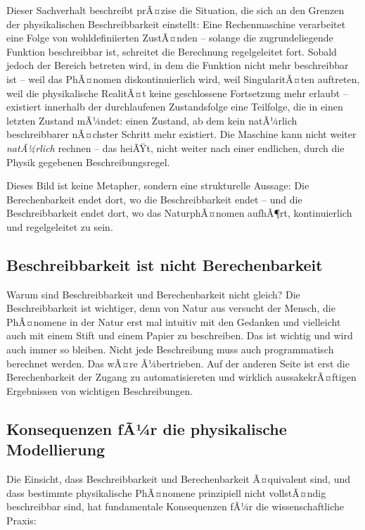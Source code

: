﻿\documentclass[12pt, a4paper]{article}
\begin{document}
	Dieser Sachverhalt beschreibt prÃ¤zise die Situation, die sich an den Grenzen der physikalischen Beschreibbarkeit einstellt: Eine Rechenmaschine verarbeitet eine Folge von wohldefiniierten ZustÃ¤nden -- solange die zugrundeliegende Funktion beschreibbar ist, schreitet die Berechnung regelgeleitet fort. Sobald jedoch der Bereich betreten wird, in dem die Funktion nicht mehr beschreibbar ist -- weil das PhÃ¤nomen diskontinuierlich wird, weil SingularitÃ¤ten auftreten, weil die physikalische RealitÃ¤t keine geschlossene Fortsetzung mehr erlaubt -- existiert innerhalb der durchlaufenen Zustandsfolge eine Teilfolge, die in einen letzten Zustand mÃ¼ndet: einen Zustand, ab dem kein natÃ¼rlich beschreibbarer nÃ¤chster Schritt mehr existiert. Die Maschine kann nicht weiter \textit{natÃ¼rlich} rechnen -- das heiÃŸt, nicht weiter nach einer endlichen, durch die Physik gegebenen Beschreibungsregel.

	Dieses Bild ist keine Metapher, sondern eine strukturelle Aussage: Die Berechenbarkeit endet dort, wo die Beschreibbarkeit endet -- und die Beschreibbarkeit endet dort, wo das NaturphÃ¤nomen aufhÃ¶rt, kontinuierlich und regelgeleitet zu sein.
	
	\subsection{Beschreibbarkeit ist nicht Berechenbarkeit}
	
	Warum sind Beschreibbarkeit und Berechenbarkeit nicht gleich? Die Beschreibbarkeit ist wichtiger, denn von Natur aus versucht der Mensch, die PhÃ¤nomene in der Natur erst mal intuitiv mit den Gedanken und vielleicht auch mit einem Stift und einem Papier zu beschreiben. Das ist wichtig und wird auch immer so bleiben. Nicht jede Beschreibung muss auch programmatisch berechnet werden. Das wÃ¤re Ã¼bertrieben. Auf der anderen Seite ist erst die Berechenbarkeit der Zugang zu automatisiereten und wirklich aussakekrÃ¤ftigen Ergebnissen von wichtigen Beschreibungen.

	\subsection{Konsequenzen fÃ¼r die physikalische Modellierung}

	Die Einsicht, dass Beschreibbarkeit und Berechenbarkeit Ã¤quivalent sind, und dass bestimmte physikalische PhÃ¤nomene prinzipiell nicht vollstÃ¤ndig beschreibbar sind, hat fundamentale Konsequenzen fÃ¼r die wissenschaftliche Praxis:
\end{document}
